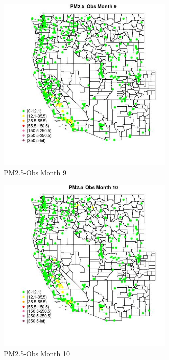 \begin{figure} 
\centering  
\includegraphics[width=0.77\textwidth]{Code_Outputs/ML_input_report_ML_input_PM25_Step5_part_d_de_duplicated_aves_ML_input_MapObsMo9PM25_Obs.jpg} 
\caption{\label{fig:ML_input_report_ML_input_PM25_Step5_part_d_de_duplicated_aves_ML_inputMapObsMo9PM25_Obs}PM2.5-Obs Month 9} 
\end{figure} 
 

\clearpage 

\begin{figure} 
\centering  
\includegraphics[width=0.77\textwidth]{Code_Outputs/ML_input_report_ML_input_PM25_Step5_part_d_de_duplicated_aves_ML_input_MapObsMo10PM25_Obs.jpg} 
\caption{\label{fig:ML_input_report_ML_input_PM25_Step5_part_d_de_duplicated_aves_ML_inputMapObsMo10PM25_Obs}PM2.5-Obs Month 10} 
\end{figure} 
 

